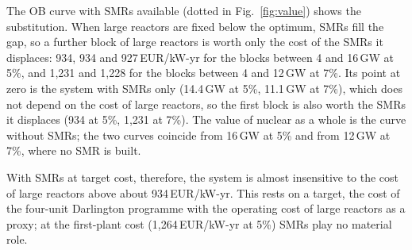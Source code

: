The OB curve with SMRs available (dotted in Fig.~\ref{fig:value}) shows the substitution. When large reactors are fixed below the optimum, SMRs fill the gap, so a further block of large reactors is worth only the cost of the SMRs it displaces: 934, 934 and 927\,EUR/kW-yr for the blocks between 4 and 16\,GW at 5\%, and 1{,}231 and 1{,}228 for the blocks between 4 and 12\,GW at 7\%. Its point at zero is the system with SMRs only (14.4\,GW at 5\%, 11.1\,GW at 7\%), which does not depend on the cost of large reactors, so the first block is also worth the SMRs it displaces (934 at 5\%, 1{,}231 at 7\%). The value of nuclear as a whole is the curve without SMRs; the two curves coincide from 16\,GW at 5\% and from 12\,GW at 7\%, where no SMR is built.

With SMRs at target cost, therefore, the system is almost insensitive to the cost of large reactors above about 934\,EUR/kW-yr. This rests on a target, the cost of the four-unit Darlington programme with the operating cost of large reactors as a proxy; at the first-plant cost (1{,}264\,EUR/kW-yr at 5\%) SMRs play no material role.
\FloatBarrier
